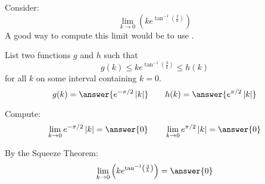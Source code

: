 \documentclass{ximera}
\author{Bart Snapp}
\begin{document}
\begin{exercise}


Consider:
\[
\lim_{k\to 0} \left(k e^{\tan ^{-1}\left(\frac{3}{k}\right)}\right)
\]
A good way to compute this limit would be to use .
\begin{exercise}
List two functions $g$ and $h$ such that
\[
g(k)\le k e^{\tan ^{-1}\left(\frac{3}{k}\right)} \le h(k)
\]
for all $k$ on some interval containing $k=0$.
\[
g(k)=\answer{e^{-\pi /2} \left| k\right|}\qquad h(k) =\answer{e^{\pi /2} \left| k\right|}
\]
\begin{exercise}
Compute:
\[
\lim_{k \to 0}e^{-\pi /2} \left| k\right| = \answer{0}\qquad \lim_{k\to 0}e^{\pi /2} \left| k\right| = \answer{0}
\]
\begin{exercise}
By the Squeeze Theorem:
\[
\lim_{k\to 0} \left(k e^{\tan ^{-1}\left(\frac{3}{k}\right)}\right) = \answer{0}
\]
\end{exercise}
\end{exercise}
\end{exercise}
\end{exercise}
\end{document}
